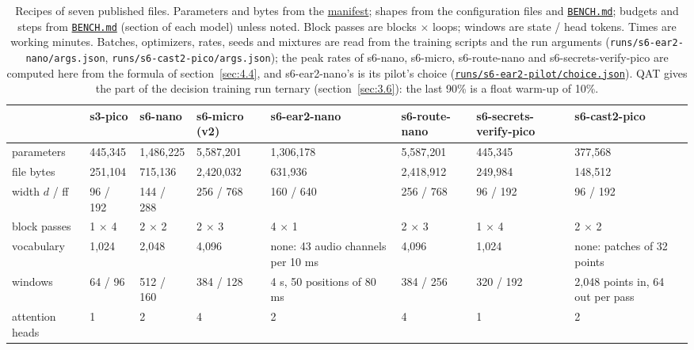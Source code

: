 \documentclass[10pt]{article}
\renewcommand{\arraystretch}{1.15}
\begin{document}
\begin{table}[p]
\centering
\scriptsize
\setlength{\tabcolsep}{3pt}\renewcommand{\arraystretch}{1.12}
\caption[Recipes of seven published files.]{Recipes of seven published files. Parameters and bytes from the \href{https://maxgfr.github.io/skycmd/models/manifest.json}{manifest}; shapes from the configuration files and \href{https://github.com/maxgfr/skycmd/blob/main/BENCH.md}{\texttt{BENCH.md}}; budgets and steps from \href{https://github.com/maxgfr/skycmd/blob/main/BENCH.md}{\texttt{BENCH.md}} (section of each model) unless noted. Block passes are blocks $\times$ loops; windows are state / head tokens. Times are working minutes. Batches, optimizers, rates, seeds and mixtures are read from the training scripts and the run arguments (\texttt{runs/\allowbreak{}s6-ear2-nano/\allowbreak{}args.json}, \texttt{runs/\allowbreak{}s6-cast2-pico/\allowbreak{}args.json}); the peak rates of s6-nano, s6-micro, s6-route-nano and s6-secrets-verify-pico are computed here from the formula of section~\ref{sec:4.4}, and s6-ear2-nano's is its pilot's choice (\href{https://github.com/maxgfr/skycmd/blob/main/runs/s6-ear2-pilot/choice.json}{\texttt{runs/\allowbreak{}s6-ear2-pilot/\allowbreak{}choice.json}}). QAT gives the part of the decision training run ternary (section~\ref{sec:3.6}): the last 90\% is a float warm-up of 10\%.}\label{tab:1}
\begin{tabularx}{\linewidth}{@{}P{1.55cm}LLLLLLL@{}}
\toprule
 & s3-pico & s6-nano & s6-micro (v2) & s6-ear2-nano & s6-route-nano & s6-secrets-verify-pico & s6-cast2-pico \\
\midrule
parameters & 445,345 & 1,486,225 & 5,587,201 & 1,306,178 & 5,587,201 & 445,345 & 377,568 \\
file bytes & 251,104 & 715,136 & 2,420,032 & 631,936 & 2,418,912 & 249,984 & 148,512 \\
width $d$ / ff & 96 / 192 & 144 / 288 & 256 / 768 & 160 / 640 & 256 / 768 & 96 / 192 & 96 / 192 \\
block passes & 1 $\times$ 4 & 2 $\times$ 2 & 2 $\times$ 3 & 4 $\times$ 1 & 2 $\times$ 3 & 1 $\times$ 4 & 2 $\times$ 2 \\
vocabulary & 1,024 & 2,048 & 4,096 & none: 43 audio channels per 10 ms & 4,096 & 1,024 & none: patches of 32 points \\
windows & 64 / 96 & 512 / 160 & 384 / 128 & 4 s, 50 positions of 80 ms & 384 / 256 & 320 / 192 & 2,048 points in, 64 out per pass \\
attention heads & 1 & 2 & 4 & 2 & 4 & 1 & 2 \\

\end{tabularx}
\end{table}
\end{document}
